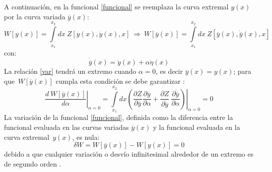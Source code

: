 \documentclass[a4paper,12pt]{article}
\begin{document}
A continuación, en la funcional \eqref{funcional} se reemplaza la curva extremal $y(x)$ por la curva variada $\overline{y}(x)$: 
\begin{equation}
W[y(x)]=\int\limits_{x_1}^{x_2}dx\ Z[y(x),\dot y(x),x] \ \Longrightarrow \ W[\overline{y}(x)]=\int\limits_{x_1}^{x_2}dx\ Z[\overline{y}(x),\dot {\overline{y}}(x),x]
\label{var} 
\end{equation}
con:
\begin{equation}
\dot {\overline{y}}(x)=\dot y(x)+\alpha\dot \eta(x)
\label{cur} 
\end{equation}
La relación \eqref{var} tendrá un extremo cuando \mbox{$\alpha=0$,} es decir \mbox{$\overline{y}(x)=y(x)$;} para \mbox{que $W[\overline{y}(x)]$} cumpla esta condición se debe garantizar \cite{hamilton}:
\begin{equation}
\left . \frac{d\ W[\overline{y}(x)]}{d\alpha}\right |_{\alpha=0}=\int\limits_{x_1}^{x_2}dx\left.\left(\frac{\partial Z}{\partial \overline{y} }\frac{\partial \overline{y}}{\partial\alpha}+\frac{\partial Z}{\partial \dot {\overline{y}}}\ \frac{\partial \dot {\overline{y}}}{\partial \alpha}\right)\right |_{\alpha=0}=0
\label{der} 
\end{equation}
La variación de la funcional \eqref{funcional}, definida como la diferencia entre la funcional evaluada en las curvas variadas $\overline{y}(x)$ y la funcional evaluada en la curva \mbox{extremal $y(x)$,} es nula:
\begin{equation}
\delta W=W[\overline{y}(x)]-W[{y}(x)]=0
\label{vaf} 
\end{equation}
debido a que cualquier variación o desvío infinitesimal alrededor de un extremo es de segundo orden \cite{hamilton,funcional}.
\\
\end{document}
